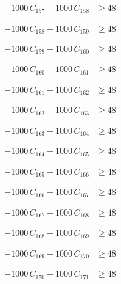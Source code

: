 \documentclass[a4paper,11pt]{article}
\begin{document}
\begin{align}
-1000\,C_{157} + 1000\,C_{158} &\geq 48 \nonumber
\end{align}

\begin{align}
-1000\,C_{158} + 1000\,C_{159} &\geq 48 \nonumber
\end{align}

\begin{align}
-1000\,C_{159} + 1000\,C_{160} &\geq 48 \nonumber
\end{align}

\begin{align}
-1000\,C_{160} + 1000\,C_{161} &\geq 48 \nonumber
\end{align}

\begin{align}
-1000\,C_{161} + 1000\,C_{162} &\geq 48 \nonumber
\end{align}

\begin{align}
-1000\,C_{162} + 1000\,C_{163} &\geq 48 \nonumber
\end{align}

\begin{align}
-1000\,C_{163} + 1000\,C_{164} &\geq 48 \nonumber
\end{align}

\begin{align}
-1000\,C_{164} + 1000\,C_{165} &\geq 48 \nonumber
\end{align}

\begin{align}
-1000\,C_{165} + 1000\,C_{166} &\geq 48 \nonumber
\end{align}

\begin{align}
-1000\,C_{166} + 1000\,C_{167} &\geq 48 \nonumber
\end{align}

\begin{align}
-1000\,C_{167} + 1000\,C_{168} &\geq 48 \nonumber
\end{align}

\begin{align}
-1000\,C_{168} + 1000\,C_{169} &\geq 48 \nonumber
\end{align}

\begin{align}
-1000\,C_{169} + 1000\,C_{170} &\geq 48 \nonumber
\end{align}

\begin{align}
-1000\,C_{170} + 1000\,C_{171} &\geq 48 \nonumber
\end{align}
\end{document}
